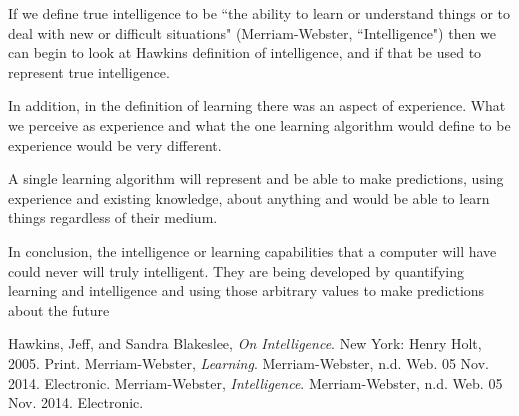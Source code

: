 \documentclass[11pt, oneside]{article}
\begin{document}

\par If we define true intelligence to be ``the ability to learn or understand things or to deal with new or difficult situations" (Merriam-Webster, ``Intelligence") then we can begin to look at Hawkins definition of intelligence, and if that be used to represent true intelligence. 


\par In addition, in the definition of learning there was an aspect of experience. What we perceive as experience and what the one learning algorithm would define to be experience would be very different. 

\par A single learning algorithm will represent and be able to make predictions, using experience and existing knowledge, about anything and would be able to learn things regardless of their medium. 

\par In conclusion, the intelligence or learning capabilities that a computer will have could never will truly intelligent. They are being developed by quantifying learning and intelligence and using those arbitrary values to make predictions about the future









\begin{thebibliography}{9}
  Hawkins, Jeff, and Sandra Blakeslee,
  \emph{On Intelligence}.
  New York: Henry Holt, 2005.
  Print.
  Merriam-Webster,
  \emph{Learning}.
  Merriam-Webster, n.d. Web. 05 Nov. 2014.
  Electronic.
  Merriam-Webster,
  \emph{Intelligence}.
  Merriam-Webster, n.d. Web. 05 Nov. 2014.
  Electronic.
\end{thebibliography}
\end{document}
